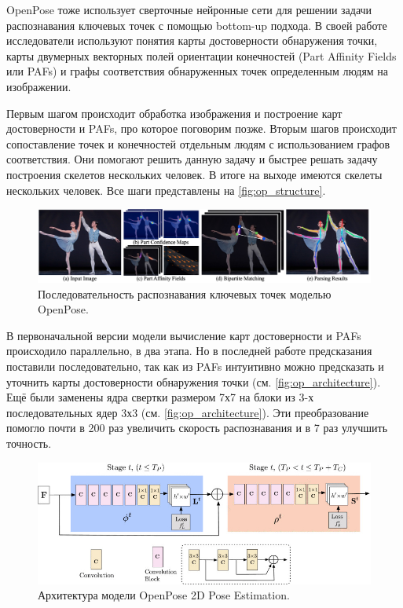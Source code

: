 OpenPose тоже использует сверточные нейронные сети для решении задачи распознавания ключевых точек с помощью bottom-up подхода. В своей работе исследователи используют понятия карты достоверности обнаружения точки, карты двумерных векторных полей ориентации конечностей (Part Affinity Fields или PAFs) и графы соответствия обнаруженных точек определенным людям на изображении.

Первым шагом происходит обработка изображения и построение карт достоверности и PAFs, про которое поговорим позже. Вторым шагов происходит сопоставление точек и конечностей отдельным людям с использованием графов соответствия. Они помогают решить данную задачу и быстрее решать задачу построения скелетов нескольких человек. В итоге на выходе имеются скелеты нескольких человек. Все шаги представлены на \autoref{fig:op_structure}.

\begin{figure}[t]
	\centering
	\includegraphics[width=\textwidth]{./images/OpenPose/structure}
	\caption{Последовательность распознавания ключевых точек моделью OpenPose. \cite{OpenPose}}
	\label{fig:op_structure}
\end{figure}

В первоначальной версии модели \cite{OpenPose_first} вычисление карт достоверности и PAFs происходило параллельно, в два этапа. Но в последней работе \cite{OpenPose} предсказания поставили последовательно, так как из PAFs интуитивно можно предсказать и уточнить карты достоверности обнаружения точки (см. \autoref{fig:op_architecture}). Ещё были заменены ядра свертки размером 7х7 на блоки из 3-х последовательных ядер 3х3 (см. \autoref{fig:op_architecture}). Эти преобразование помогло почти в 200 раз увеличить скорость распознавания и в 7 раз улучшить точность.

\begin{figure}[h]
	\centering
	\includegraphics[width=\textwidth * 4 / 5]{./images/OpenPose/architecture.jpg}
	\caption{Архитектура модели OpenPose 2D Pose Estimation. \cite{OpenPose}}
	\label{fig:op_architecture}
\end{figure}



